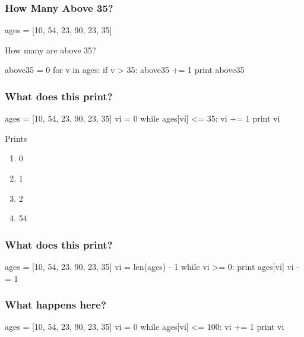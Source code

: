 \begin{frame}[fragile]
\frametitle{How Many Above 35?}

\begin{python}
ages = [10, 54, 23, 90, 23, 35]
\end{python}

How many are above 35?

\pause

\begin{python}
above35 = 0
for v in ages:
    if v > 35:
        above35 += 1
print above35
\end{python}

\end{frame}


\begin{frame}[fragile]
\frametitle{What does this print?}

\begin{python}
ages = [10, 54, 23, 90, 23, 35]
vi = 0
while ages[vi] <= 35:
    vi += 1
print vi
\end{python}

Prints

\begin{enumerate}
\item 0
\item 1
\item 2
\item 54
\end{enumerate}

\end{frame}

\begin{frame}[fragile]
\frametitle{What does this print?}

\begin{python}
ages = [10, 54, 23, 90, 23, 35]
vi = len(ages) - 1
while vi >= 0:
    print ages[vi]
    vi -= 1
\end{python}

\end{frame}


\begin{frame}[fragile]
\frametitle{What happens here?}

\begin{python}
ages = [10, 54, 23, 90, 23, 35]
vi = 0
while ages[vi] <= 100:
    vi += 1
print vi
\end{python}

\end{frame}


